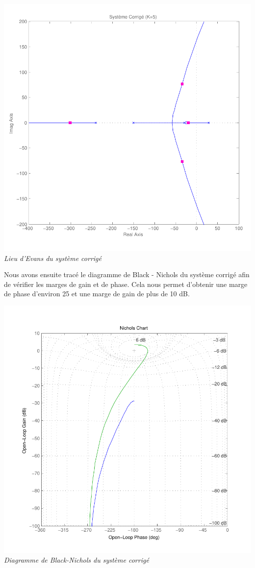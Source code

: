 \documentclass[11pt, french]{article} %
\begin{document}
\begin{center}
\includegraphics[scale=0.50]{RL_Sys_AvPh_K5.pdf}
\\
\emph{Lieu d'Evans du système corrigé}
\end{center}

Nous avons ensuite tracé le diagramme de Black - Nichols du système corrigé afin de vérifier les marges de gain et de phase. Cela nous permet d'obtenir une marge de phase d'environ 25 et une marge de gain de plus de 10 dB.

\begin{center}
\includegraphics[scale=0.50]{MatBlack.pdf}
\\
\emph{Diagramme de Black-Nichols du système corrigé}
\end{center}
\end{document}

